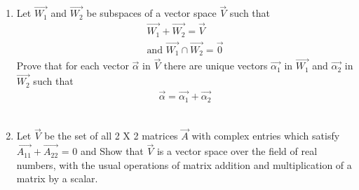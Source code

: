 \begin{enumerate}[label=\thesubsection.\arabic*.,ref=\thesubsection.\theenumi]
%
\solution

\item Let $\vec{W_1}$ and $\vec{W_2}$ be subspaces of a vector space $\vec{V}$ such that 
\begin{align}
   \vec{W_1}+\vec{W_2}=\vec{V} \\
   \text{and  }  \vec{W_1}\cap \vec{W_2}=\vec{0}\label{eq:solutions/2/2/9/1}
\end{align}
Prove that for each vector $\vec{\alpha}$ in $\vec{V}$ there are unique vectors $\vec{\alpha_1}$ in $\vec{W_1}$ and $\vec{\alpha_2}$ in $\vec{W_2}$ such that
\begin{align}
    \vec{\alpha}=\vec{\alpha_1}+\vec{\alpha_2}\label{eq:solutions/2/2/9/2}
\end{align}
%
\\
\solution

\item Let $\vec{V}$ be the set of all 2 X 2 matrices $\vec{A}$ with complex entries which satisfy $ \vec{A_{11}} + \vec{A_{22}}$ = 0 and Show that $\vec{V}$ is a vector space over the field of real numbers, with the
usual operations of matrix addition and multiplication of a matrix by a scalar. 
%
\\
\solution

%
\end{enumerate}


